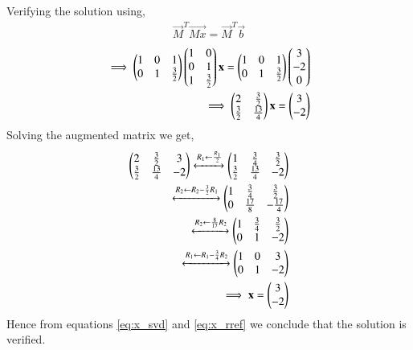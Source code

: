 \documentclass[journal,12pt,twocolumn]{IEEEtran}
\begin{document}
Verifying the solution using,
\begin{align}
\vec{M}^T\vec{Mx} = \vec{M}^T\vec{b}
\end{align}
\begin{align}
\implies \begin{pmatrix}1&0&1\\0&1&\frac{3}{2}\end{pmatrix} \begin{pmatrix}1&0\\0&1\\1&\frac{3}{2}\end{pmatrix} \mathbf{x} = \begin{pmatrix}1&0&1\\0&1&\frac{3}{2}\end{pmatrix}\begin{pmatrix}3\\-2\\0\end{pmatrix}\\
\implies \begin{pmatrix}2&\frac{3}{2}\\\frac{3}{2}&\frac{13}{4}\end{pmatrix}\mathbf{x} = \begin{pmatrix}3\\-2\end{pmatrix}
\end{align}
Solving the augmented matrix we get,
\begin{align}
\begin{pmatrix}2&\frac{3}{2}&3\\\frac{3}{2}&\frac{13}{4}&-2\end{pmatrix}\xleftrightarrow[]{R_1\leftarrow\frac{R_1}{2}}\begin{pmatrix}1 &\frac{3}{4}&\frac{3}{2}\\\frac{3}{2}&\frac{13}{4}&-2\end{pmatrix}\\
\xleftrightarrow[]{R_2\leftarrow R_2-\frac{3}{2}R_1}\begin{pmatrix}1&\frac{3}{4}&\frac{3}{2}\\0&\frac{17}{8}&-\frac{17}{4}\end{pmatrix}\\
\xleftrightarrow[]{R_2\leftarrow \frac{8}{17}R_2}\begin{pmatrix}1&\frac{3}{4}&\frac{3}{2}\\0&1&-2\end{pmatrix}\\
\xleftrightarrow[]{R_1\leftarrow R_1-\frac{3}{4}R_2}\begin{pmatrix}1&0&3\\0&1&-2\end{pmatrix}\\
\implies \mathbf{x} = \begin{pmatrix}3\\-2 \end{pmatrix}\label{eq:x_rref}
\end{align}
Hence from equations \eqref{eq:x_svd} and \eqref{eq:x_rref} we conclude that the solution is verified.
\end{document}
